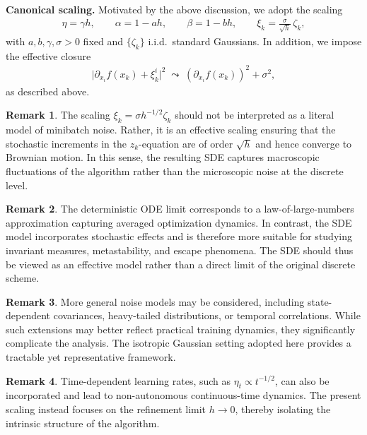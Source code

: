\documentclass[11pt, a4paper,leqno]{amsart}
\theoremstyle{definition}
\newtheorem{remark}{Remark}[section]
\numberwithin{equation}{section}
\begin{document}
\medskip
\noindent
\textbf{Canonical scaling.}
Motivated by the above discussion, we adopt the scaling
\begin{align}\label{scale}
\eta = \gamma h, \qquad
\alpha = 1 - a h, \qquad
\beta = 1 - b h, \qquad
\xi_k = \frac{\sigma}{\sqrt{h}}\,\zeta_k,
\end{align}
with $a,b,\gamma,\sigma>0$ fixed and $\{\zeta_k\}$ i.i.d.\ standard Gaussians. In addition, we impose the effective closure
\begin{align}\label{scale+}
\bigl|\partial_{x_i}f(x_k)+\xi_k^i\bigr|^2
\;\leadsto\;
(\partial_{x_i}f(x_k))^2+\sigma^2,
\end{align}
as described above.


\begin{remark}
The scaling $\xi_k=\sigma h^{-1/2}\zeta_k$ should not be interpreted as a literal model of minibatch noise. Rather, it is an effective scaling ensuring that the stochastic increments in the $z_k$-equation are of order $\sqrt{h}$ and hence converge to Brownian motion. In this sense, the resulting SDE captures macroscopic fluctuations of the algorithm rather than the microscopic noise at the discrete level.
\end{remark}

\begin{remark}
The deterministic ODE limit corresponds to a law-of-large-numbers approximation capturing averaged optimization dynamics. In contrast, the SDE model incorporates stochastic effects and is therefore more suitable for studying invariant measures, metastability, and escape phenomena. The SDE should thus be viewed as an effective model rather than a direct limit of the original discrete scheme.
\end{remark}

\begin{remark}
More general noise models may be considered, including state-dependent covariances, heavy-tailed distributions, or temporal correlations. While such extensions may better reflect practical training dynamics, they significantly complicate the analysis. The isotropic Gaussian setting adopted here provides a tractable yet representative framework.
\end{remark}

\begin{remark}
Time-dependent learning rates, such as $\eta_t \propto t^{-1/2}$, can also be incorporated and lead to non-autonomous continuous-time dynamics. The present scaling instead focuses on the refinement limit $h \to 0$, thereby isolating the intrinsic structure of the algorithm.
\end{remark}
\end{document}
